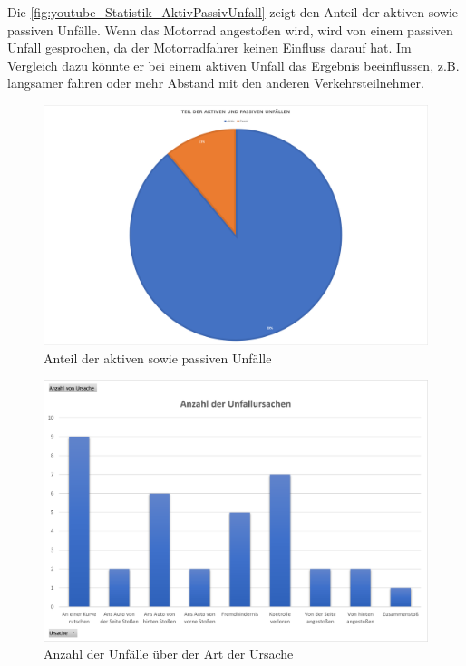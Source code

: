 Die \autoref{fig:youtube_Statistik_AktivPassivUnfall} zeigt den Anteil der aktiven sowie passiven Unfälle. Wenn das Motorrad angestoßen wird, wird von einem passiven Unfall gesprochen, da der Motorradfahrer keinen Einfluss darauf hat. Im Vergleich dazu könnte er bei einem aktiven Unfall das Ergebnis beeinflussen, z.B. langsamer fahren oder mehr Abstand mit den anderen Verkehrsteilnehmer.

\begin{figure}[H]
	\centering
	\includegraphics[width=\linewidth]{Bilder/youtube_Statistik_AktivPassivUnfall.png}
	\caption{Anteil der aktiven sowie passiven Unfälle}
	\label{fig:youtube_Statistik_AktivPassivUnfall}
\end{figure}

\begin{figure}[H]
	\centering
	\includegraphics[width=\linewidth]{Bilder/youtube_Statistik_AnzahlUnfallUrsachen.png}
	\caption{Anzahl der Unfälle über der Art der Ursache}
	\label{fig:youtube_Statistik_AnzahlUnfallUrsachen}
\end{figure}

